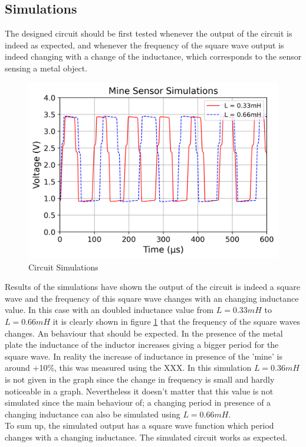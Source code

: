 \subsection{Simulations}

The designed circuit should be first tested whenever the output of the circuit is indeed as expected, and whenever the frequency of the square wave output is indeed changing with a change of the inductance, which corresponds to the sensor sensing a metal object.

\begin{figure}[h]
    \centering
    \includegraphics[scale = 0.7]{EPO 2 Images & Plots/Mine Sensor/666uH.png}
    \caption{Circuit Simulations}
    \label{fig:sim_sensor_neutral}
\end{figure}

Results of the simulations have shown the output of the circuit is indeed a square wave and the frequency of this square wave changes with an changing inductance value. In this case with an doubled inductance value from \(L=0.33mH\) to \(L = 0.66mH\) it is clearly shown in figure \ref{fig:sim_sensor_neutral} that the frequency of the square waves changes. An behaviour that should be expected. In the presence of the metal plate the inductance of the inductor increases giving a bigger period for the square wave. In reality the increase of inductance in presence of the 'mine' is around +10\%, this was measured using the XXX. %
In this simulation \(L=0.36mH\) is not given in the graph since the change in frequency is small and hardly noticeable in a graph. Nevertheless it doesn't matter that this value is not simulated since the main behaviour of; a changing period in presence of a changing inductance can also be simulated using \(L= 0.66mH\).\\
To sum up, the simulated output has a square wave function which period changes with a changing inductance. The simulated circuit works as expected.

